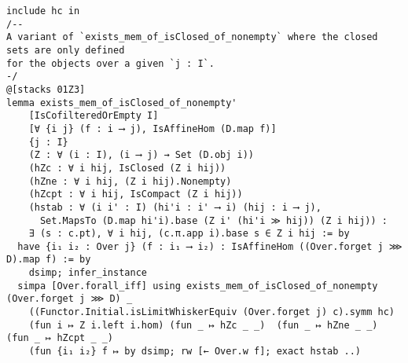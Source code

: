 \documentclass{article}
\begin{document}
\begin{lstlisting}[language=Lean, caption={AffineTransitionLimit.lean}]
include hc in
/--
A variant of `exists_mem_of_isClosed_of_nonempty` where the closed sets are only defined
for the objects over a given `j : I`.
-/
@[stacks 01Z3]
lemma exists_mem_of_isClosed_of_nonempty'
    [IsCofilteredOrEmpty I]
    [∀ {i j} (f : i ⟶ j), IsAffineHom (D.map f)]
    {j : I}
    (Z : ∀ (i : I), (i ⟶ j) → Set (D.obj i))
    (hZc : ∀ i hij, IsClosed (Z i hij))
    (hZne : ∀ i hij, (Z i hij).Nonempty)
    (hZcpt : ∀ i hij, IsCompact (Z i hij))
    (hstab : ∀ (i i' : I) (hi'i : i' ⟶ i) (hij : i ⟶ j),
      Set.MapsTo (D.map hi'i).base (Z i' (hi'i ≫ hij)) (Z i hij)) :
    ∃ (s : c.pt), ∀ i hij, (c.π.app i).base s ∈ Z i hij := by
  have {i₁ i₂ : Over j} (f : i₁ ⟶ i₂) : IsAffineHom ((Over.forget j ⋙ D).map f) := by
    dsimp; infer_instance
  simpa [Over.forall_iff] using exists_mem_of_isClosed_of_nonempty (Over.forget j ⋙ D) _
    ((Functor.Initial.isLimitWhiskerEquiv (Over.forget j) c).symm hc)
    (fun i ↦ Z i.left i.hom) (fun _ ↦ hZc _ _)  (fun _ ↦ hZne _ _)  (fun _ ↦ hZcpt _ _)
    (fun {i₁ i₂} f ↦ by dsimp; rw [← Over.w f]; exact hstab ..)

\end{lstlisting}
\end{document}
